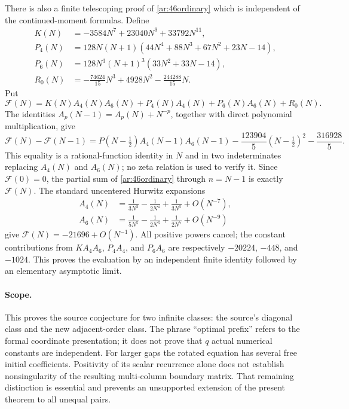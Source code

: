 There is also a finite telescoping proof of \eqref{ar:46ordinary}
which is independent of the continued-moment formulas. Define
\begin{align*}
 K(N)&=-3584N^7+23040N^9+33792N^{11},\\
 P_4(N)&=128N(N+1)
       (44N^4+88N^3+67N^2+23N-14),\\
 P_6(N)&=128N^3(N+1)^3(33N^2+33N-14),\\
 R_0(N)&=-\frac{74624}{15}N^3+4928N^2-\frac{244288}{15}N.
\end{align*}
Put
\[
 \mathcal F(N)=K(N)A_4(N)A_6(N)
      +P_4(N)A_4(N)+P_6(N)A_6(N)+R_0(N).
\]
The identities $A_p(N-1)=A_p(N)+N^{-p}$, together with direct
polynomial multiplication, give
\begin{equation}\label{ar:46telescoping}
 \mathcal F(N)-\mathcal F(N-1)
  =P(N-\tfrac12)A_4(N-1)A_6(N-1)
      -\frac{123904}{5}(N-\tfrac12)^2-\frac{316928}{5}.
\end{equation}
This equality is a rational-function identity in $N$ and in two
indeterminates replacing $A_4(N)$ and $A_6(N)$; no zeta relation is
used to verify it. Since $\mathcal F(0)=0$, the partial sum of
\eqref{ar:46ordinary} through $n=N-1$ is exactly $\mathcal F(N)$.
The standard uncentered Hurwitz expansions
\[
 \begin{split}
 A_4(N)&=\frac1{3N^3}-\frac1{2N^4}+\frac1{3N^5}+O(N^{-7}),\\
 A_6(N)&=\frac1{5N^5}-\frac1{2N^6}+\frac1{2N^7}+O(N^{-9})
 \end{split}
\]
give $\mathcal F(N)=-21696+O(N^{-1})$. All positive powers
cancel; the constant contributions from $KA_4A_6$, $P_4A_4$, and
$P_6A_6$ are respectively $-20224$, $-448$, and $-1024$.
This proves the evaluation by an independent finite identity followed
by an elementary asymptotic limit.

\paragraph{Scope.}
This proves the source conjecture for two infinite classes: the source's
diagonal class and the new adjacent-order class. The phrase ``optimal
prefix'' refers to the formal coordinate presentation; it does not
prove that $q$ actual numerical constants are independent. For larger
gaps the rotated equation has several free initial coefficients.
Positivity of its scalar recurrence alone does not establish
nonsingularity of the resulting multi-column boundary matrix. That
remaining distinction is essential and prevents an unsupported
extension of the present theorem to all unequal pairs.

